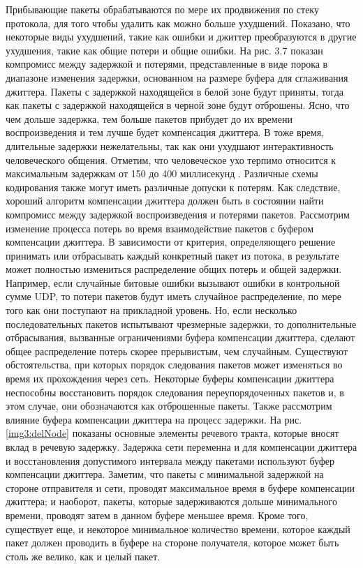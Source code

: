 Прибывающие пакеты обрабатываются по мере их продвижения по стеку протокола, для того чтобы удалить как можно больше ухудшений. Показано, что некоторые виды ухудшений, такие как ошибки и джиттер преобразуются в другие ухудшения, такие как общие потери и общие ошибки.
На рис. 3.7 показан компромисс между задержкой и потерями, представленные в виде порока в диапазоне изменения задержки, основанном на размере буфера для сглаживания джиттера. Пакеты с задержкой находящейся в белой зоне будут приняты, тогда как пакеты с задержкой находящейся в черной зоне будут отброшены. Ясно, что чем дольше задержка, тем больше пакетов прибудет до их времени воспроизведения и тем лучше будет компенсация джиттера. В тоже время, длительные задержки нежелательны, так как они ухудшают интерактивность человеческого общения. Отметим, что человеческое ухо терпимо относится к максимальным задержкам от 150 до 400 миллисекунд \cite{Moon}. Различные схемы кодирования также могут иметь различные допуски к потерям. Как следствие, хороший алгоритм компенсации джиттера должен быть в состоянии найти компромисс между задержкой воспроизведения и потерями пакетов.
Рассмотрим изменение процесса потерь во время взаимодействие пакетов с буфером компенсации джиттера. В зависимости от критерия, определяющего решение принимать или отбрасывать каждый конкретный пакет из потока, в результате может полностью измениться распределение общих потерь и общей задержки. Например, если случайные битовые ошибки вызывают ошибки в контрольной сумме UDP, то потери пакетов будут иметь случайное распределение, по мере того как они поступают на прикладной уровень. Но, если несколько последовательных пакетов испытывают чрезмерные задержки, то дополнительные отбрасывания, вызванные ограничениями буфера компенсации джиттера, сделают общее распределение потерь скорее прерывистым, чем случайным.
Существуют обстоятельства, при которых порядок следования пакетов может изменяться во время их прохождения через сеть. Некоторые буферы компенсации джиттера неспособны восстановить порядок следования переупорядоченных пакетов и, в этом случае, они обозначаются как отброшенные пакеты.
Также рассмотрим влияние буфера компенсации джиттера на процесс задержки. На рис. \ref{img3:delNode} показаны основные элементы речевого тракта, которые вносят вклад в речевую задержку. Задержка сети переменна и для компенсации джиттера и восстановления допустимого интервала между пакетами используют буфер компенсации джиттера. Заметим, что пакеты с минимальной задержкой на стороне отправителя и сети, проводят максимальное время в буфере компенсации джиттера; и наоборот, пакеты, которые задерживаются дольше минимального времени, проводят затем в данном буфере меньшее время. Кроме того, существует еще, и некоторое минимальное количество времени, которое каждый пакет должен проводить в буфере на стороне получателя, которое может быть столь же велико, как и целый пакет.

